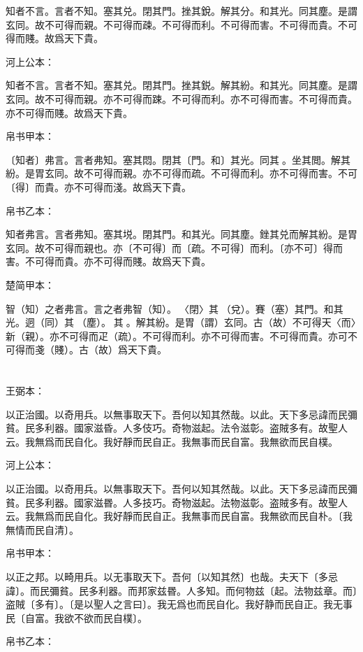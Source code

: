 \documentclass[a5paper]{ctexbook}
\begin{document}
    知者不言。言者不知。塞其兑。閉其門。挫其銳。解其分。和其光。同其塵。是謂玄同。故不可得而親。不可得而疎。不可得而利。不可得而害。不可得而貴。不可得而賤。故爲天下貴。

    河上公本：

    知者不言。言者不知。塞其兑。閉其門。挫其鋭。解其紛。和其光。同其塵。是謂玄同。故不可得而親。亦不可得而踈。不可得而利。亦不可得而害。不可得而貴。亦不可得而賤。故爲天下貴。

    帛书甲本：

    〔知者〕弗言。言者弗知。塞其悶。閉其〔門。和〕其光。同其𡑁。坐其閲。解其紛。是胃玄同。故不可得而親。亦不可得而疏。不可得而利。亦不可得而害。不可〔得〕而貴。亦不可得而淺。故爲天下貴。

    帛书乙本：

    知者弗言。言者弗知。塞其㙂。閉其門。和其光。同其塵。銼其兑而解其紛。是胃玄同。故不可得而親也。亦〔不可得〕而〔疏。不可得〕而利。〔亦不可〕得而害。不可得而貴。亦不可得而賤。故爲天下貴。

    楚简甲本：

    智（知）之者弗言。言之者弗智（知）。𨳮〈閉〉其𨓚（兌）。賽（塞）其門。和其光。迵（同）其󶴤（塵）。󶴤其󶩴。解其紛。是胃（謂）玄同。古（故）不可得天〈而〉新（親）。亦不可得而疋（疏）。不可得而利。亦不可得而害。不可得而貴。亦可不可得而戔（賤）。古（故）爲天下貴。

    \chapter{}
    王弼本：

    以正治國。以奇用兵。以無事取天下。吾何以知其然哉。以此。天下多忌諱而民彌貧。民多利器。國家滋昏。人多伎巧。奇物滋起。法令滋彰。盗賊多有。故聖人云。我無爲而民自化。我好靜而民自正。我無事而民自富。我無欲而民自樸。

    河上公本：

    以正治國。以奇用兵。以無事取天下。吾何以知其然哉。以此。天下多忌諱而民彌貧。民多利器。國家滋昬。人多技巧。奇物滋起。法物滋彰。盗賊多有。故聖人云。我無爲而民自化。我好靜而民自正。我無事而民自富。我無欲而民自朴。〔我無情而民自清〕。

    帛书甲本：

    以正之邦。以畸用兵。以无事取天下。吾何〔以知其然〕也哉。夫天下〔多忌諱〕。而民彌貧。民多利器。而邦家兹昬。人多知。而何物兹〔起。法物兹章。而〕盗賊〔多有〕。〔是以聖人之言曰〕。我无爲也而民自化。我好静而民自正。我无事民〔自富。我欲不欲而民自樸〕。

    帛书乙本：
\end{document}
